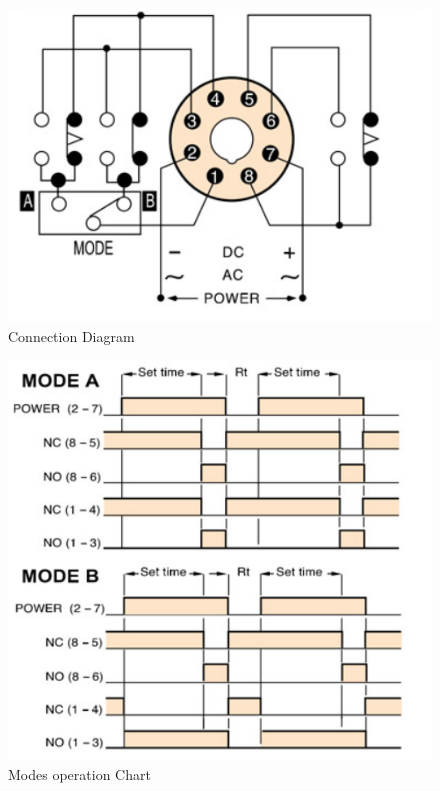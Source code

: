 \documentclass[runningheads]{llncs}
\begin{document}


\begin{figure}[h]
    \centering
    \caption{Connection Diagram}\label{fig:ConnectionDiagram}
    \includegraphics[scale = 0.5]{conectionDiagram.png}
\end{figure}



\begin{figure}[h]
    \centering
    \caption{Modes operation Chart}\label{fig:ModeOperation}
    \includegraphics[scale = 0.7]{operationTime.png}
\end{figure}
\end{document}
